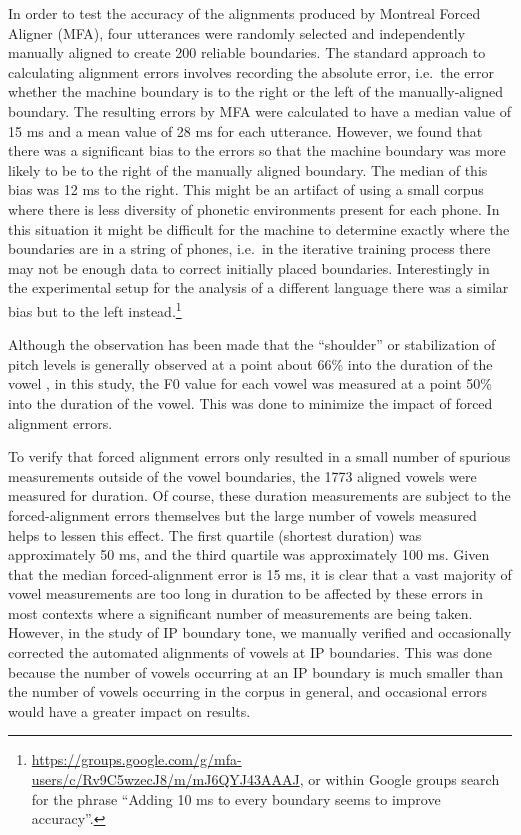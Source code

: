 \documentclass[
  11pt,
  b5paper,
]{article}
\begin{document}
In order to test the accuracy of the alignments produced by Montreal
Forced Aligner (MFA), four utterances were randomly selected and
independently manually aligned to create 200 reliable boundaries. The
standard approach to calculating alignment errors involves recording the
absolute error, i.e.~the error whether the machine boundary is to the
right or the left of the manually-aligned boundary. The resulting errors
by MFA were calculated to have a median value of 15 ms and a mean value
of 28 ms for each utterance. However, we found that there was a
significant bias to the errors so that the machine boundary was more
likely to be to the right of the manually aligned boundary. The median
of this bias was 12 ms to the right. This might be an artifact of using
a small corpus where there is less diversity of phonetic environments
present for each phone. In this situation it might be difficult for the
machine to determine exactly where the boundaries are in a string of
phones, i.e.~in the iterative training process there may not be enough
data to correct initially placed boundaries. Interestingly in the
experimental setup for the analysis of a different language
\autocite{kempton_corpus_2020} there was a similar bias but to the left
instead.\footnote{\url{https://groups.google.com/g/mfa-users/c/Rv9C5wzecJ8/m/mJ6QYJ43AAAJ},
  or within Google groups search for the phrase ``Adding 10 ms to every
  boundary seems to improve accuracy''.}

Although the observation has been made that the ``shoulder'' or
stabilization of pitch levels is generally observed at a point about
66\% into the duration of the vowel
\autocite[257--299]{Beavon-Ham2019Tone}, in this study, the F0 value for
each vowel was measured at a point 50\% into the duration of the vowel.
This was done to minimize the impact of forced alignment errors.

To verify that forced alignment errors only resulted in a small number
of spurious measurements outside of the vowel boundaries, the 1773
aligned vowels were measured for duration. Of course, these duration
measurements are subject to the forced-alignment errors themselves but
the large number of vowels measured helps to lessen this effect. The
first quartile (shortest duration) was approximately 50 ms, and the
third quartile was approximately 100 ms. Given that the median
forced-alignment error is 15 ms, it is clear that a vast majority of
vowel measurements are too long in duration to be affected by these
errors in most contexts where a significant number of measurements are
being taken. However, in the study of IP boundary tone, we manually
verified and occasionally corrected the automated alignments of vowels
at IP boundaries. This was done because the number of vowels occurring
at an IP boundary is much smaller than the number of vowels occurring in
the corpus in general, and occasional errors would have a greater impact
on results.
\end{document}
